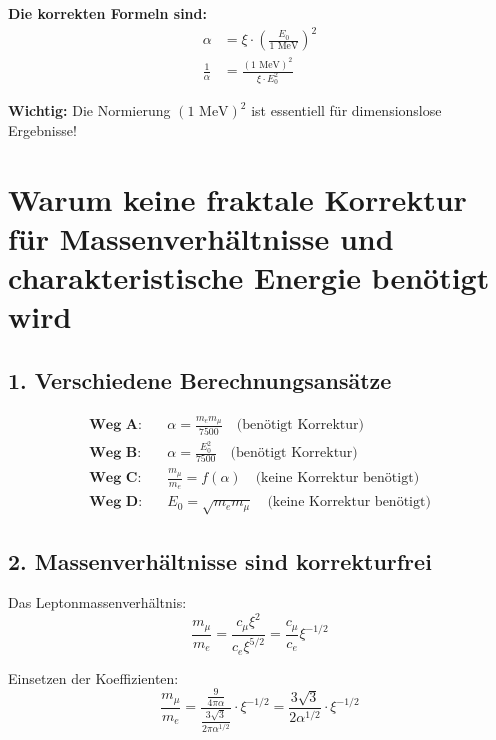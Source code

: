 \documentclass[12pt,a4paper]{article}
\theoremstyle{definition}
\begin{document}
\begin{tcolorbox}[colback=blue!5!white,colframe=blue!75!black]
	\textbf{Die korrekten Formeln sind:}
	\begin{align*}
		\alpha &= \xi \cdot \left(\frac{E_0}{1 \text{ MeV}}\right)^2 \\
		\frac{1}{\alpha} &= \frac{(1 \text{ MeV})^2}{\xi \cdot E_0^2}
	\end{align*}
\end{tcolorbox}

\begin{tcolorbox}[colback=red!5!white,colframe=red!75!black]
	\textbf{Wichtig:} Die Normierung $(1 \text{ MeV})^2$ ist essentiell für dimensionslose Ergebnisse!
\end{tcolorbox}

\section{Warum keine fraktale Korrektur für Massenverhältnisse und charakteristische Energie benötigt wird}

\subsection{1. Verschiedene Berechnungsansätze}

\begin{align*}
	\textbf{Weg A:} &\quad \alpha = \frac{m_e m_\mu}{7500} \quad \text{(benötigt Korrektur)} \\
	\textbf{Weg B:} &\quad \alpha = \frac{E_0^2}{7500} \quad \text{(benötigt Korrektur)} \\
	\textbf{Weg C:} &\quad \frac{m_\mu}{m_e} = f(\alpha) \quad \text{(keine Korrektur benötigt)} \\
	\textbf{Weg D:} &\quad E_0 = \sqrt{m_e m_\mu} \quad \text{(keine Korrektur benötigt)}
\end{align*}

\subsection{2. Massenverhältnisse sind korrekturfrei}

Das Leptonmassenverhältnis:
\[
\frac{m_\mu}{m_e} = \frac{c_\mu \xi^2}{c_e \xi^{5/2}} = \frac{c_\mu}{c_e} \xi^{-1/2}
\]

Einsetzen der Koeffizienten:
\[
\frac{m_\mu}{m_e} = \frac{\frac{9}{4\pi\alpha}}{\frac{3\sqrt{3}}{2\pi\alpha^{1/2}}} \cdot \xi^{-1/2} = \frac{3\sqrt{3}}{2\alpha^{1/2}} \cdot \xi^{-1/2}
\]
\end{document}
